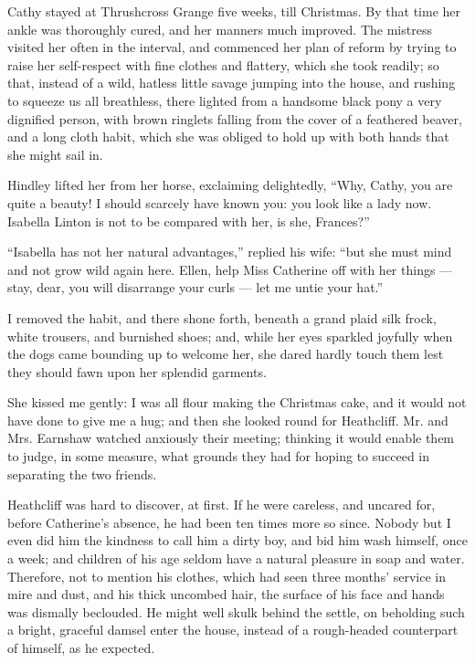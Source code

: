 \par Cathy stayed at Thrushcross Grange five weeks, till Christmas. By that time her ankle was thoroughly cured, and her manners much improved. The mistress visited her often in the interval, and commenced her plan of reform by trying to raise her self-respect with fine clothes and flattery, which she took readily; so that, instead of a wild, hatless little savage jumping into the house, and rushing to squeeze us all breathless, there lighted from a handsome black pony a very dignified person, with brown ringlets falling from the cover of a feathered beaver, and a long cloth habit, which she was obliged to hold up with both hands that she might sail in.
\par Hindley lifted her from her horse, exclaiming delightedly, “Why, Cathy, you are quite a beauty! I should scarcely have known you: you look like a lady now. Isabella Linton is not to be compared with her, is she, Frances?”
\par “Isabella has not her natural advantages,” replied his wife: “but she must mind and not grow wild again here. Ellen, help Miss Catherine off with her things — stay, dear, you will disarrange your curls — let me untie your hat.”
\par I removed the habit, and there shone forth, beneath a grand plaid silk frock, white trousers, and burnished shoes; and, while her eyes sparkled joyfully when the dogs came bounding up to welcome her, she dared hardly touch them lest they should fawn upon her splendid garments.
\par She kissed me gently: I was all flour making the Christmas cake, and it would not have done to give me a hug; and then she looked round for Heathcliff. Mr. and Mrs. Earnshaw watched anxiously their meeting; thinking it would enable them to judge, in some measure, what grounds they had for hoping to succeed in separating the two friends.
\par Heathcliff was hard to discover, at first. If he were careless, and uncared for, before Catherine's absence, he had been ten times more so since. Nobody but I even did him the kindness to call him a dirty boy, and bid him wash himself, once a week; and children of his age seldom have a natural pleasure in soap and water. Therefore, not to mention his clothes, which had seen three months' service in mire and dust, and his thick uncombed hair, the surface of his face and hands was dismally beclouded. He might well skulk behind the settle, on beholding such a bright, graceful damsel enter the house, instead of a rough-headed counterpart of himself, as he expected.
